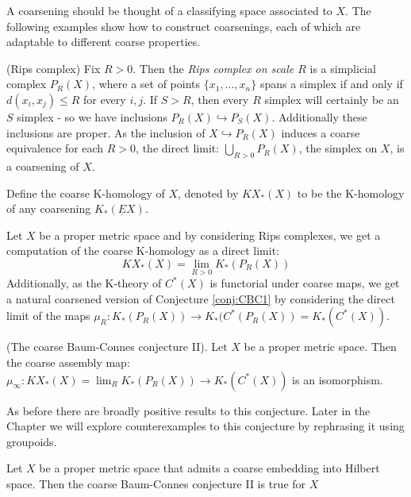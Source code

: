 A coarsening should be thought of a classifying space associated to $X$. The following examples show how to construct coarsenings, each of which are adaptable to different coarse properties.

\begin{example}
(Rips complex) Fix $R>0$. Then the \textit{Rips complex on scale $R$} is a simplicial complex $P_{R}(X)$, where a set of points $\lbrace x_{1},...,x_{n} \rbrace$ spans a simplex if and only if $d(x_{i},x_{j}) \leq R$ for every $i,j$. If $S>R$, then every $R$ simplex will certainly be an $S$ simplex - so we have inclusions $P_{R}(X)\hookrightarrow P_{S}(X)$. Additionally these inclusions are proper. As the inclusion of $X \hookrightarrow P_{R}(X)$ induces a coarse equivalence for each $R>0$, the direct limit: $\bigcup_{R>0}P_{R}(X)$, the simplex on $X$, is a coarsening of $X$.
\end{example}

\begin{definition}
Define the coarse K-homology of $X$, denoted by $KX_{*}(X)$ to be the K-homology of any coarsening $K_{*}(\underline{E}X)$.
\end{definition}

Let $X$ be a proper metric space and by considering Rips complexes, we get a computation of the coarse K-homology as a direct limit:
\begin{equation*}
KX_{*}(X) = \lim_{R>0}K_{*}(P_{R}(X))
\end{equation*}
Additionally, as the K-theory of $C^{*}(X)$ is functorial under coarse maps, we get a natural coarsened version of Conjecture \ref{conj:CBC1} by considering the direct limit of the maps $\mu_{R}: K_{*}(P_{R}(X)) \rightarrow K_{*}(C^{*}(P_{R}(X))=K_{*}(C^{*}(X))$.
\begin{conjecture}\label{conj:CBC2}(The coarse Baum-Connes conjecture II).
Let $X$ be a proper metric space. Then the coarse assembly map: $\mu_{\infty}:KX_{*}(X)= \lim_{R}K_{*}(P_{R}(X)) \rightarrow K_{*}(C^{*}(X))$ is an isomorphism. 
\end{conjecture}

As before there are broadly positive results to this conjecture. Later in the Chapter we will explore counterexamples to this conjecture by rephrasing it using groupoids.

\begin{theorem}
Let $X$ be a proper metric space that admits a coarse embedding into Hilbert space. Then the coarse Baum-Connes conjecture II is true for $X$ 
\end{theorem}

